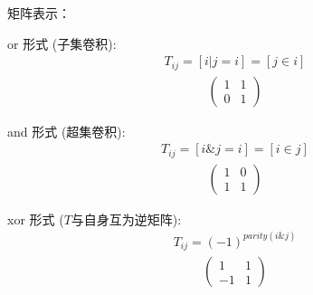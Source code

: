 矩阵表示：

or 形式 (子集卷积):
$$\begin{aligned}T_{ij} = [i|j=i] = [j \in i]\end{aligned}$$
$$
\begin{aligned}
\begin{pmatrix}
    1&1\\0&1
\end{pmatrix}
\end{aligned}
$$

and 形式 (超集卷积):
$$\begin{aligned}T_{ij} = [i\&j=i] = [i \in j]\end{aligned}$$
$$
\begin{aligned}
\begin{pmatrix}
    1&0\\1&1
\end{pmatrix}
\end{aligned}
$$

xor 形式 ($T$与自身互为逆矩阵):
$$\begin{aligned}T_{ij} = (-1)^{parity(i\&j)}\end{aligned}$$
$$
\begin{aligned}
\begin{pmatrix}
    1&1\\-1&1
\end{pmatrix}
\end{aligned}
$$

\inputminted{cpp}{../src-midori/math/FWT.cpp}





